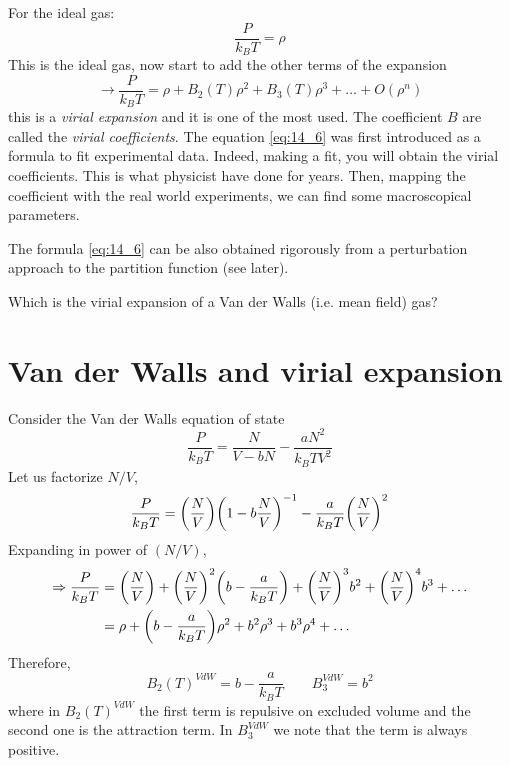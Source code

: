 \documentclass[../main/main.tex]{subfiles}
\begin{document}
For the ideal gas:
\begin{equation}
  \frac{P}{k_B T} = \rho
\end{equation}
This is the ideal gas, now start to add the other terms of the expansion
\begin{equation}
  \rightarrow \frac{P}{k_B T} = \rho + B_2 (T) \rho ^2 + B_3 (T)\rho ^3+ \dots + O(\rho ^n)
  \label{eq:14_6}
\end{equation}
this is a \emph{virial expansion} and it is one of the most used. The coefficient \( B \) are called the \emph{virial coefficients}.
The equation \eqref{eq:14_6} was first introduced as a formula to fit experimental data. Indeed, making a fit, you will obtain the virial coefficients. This is what physicist have done for years.  Then, mapping the coefficient with the real world experiments, we can find some macroscopical parameters.

The formula \eqref{eq:14_6} can be also obtained rigorously from a perturbation approach to the partition function (see later).

Which is the virial expansion of a Van der Walls (i.e. mean field) gas?

\section{Van der Walls and virial expansion}
Consider the Van der Walls equation of state
\begin{equation}
  \frac{P}{k_B T} = \frac{N}{V-bN} - \frac{a N^2}{k_B T V^2}
\end{equation}
Let us factorize \( N/V \),
\begin{equation}
  \frac{P}{k_B T} = \qty(\frac{N}{V}) \qty(1 - b \frac{N}{V})^{-1} - \frac{a}{k_B T}\qty(\frac{N}{V})^2
\end{equation}
Expanding in power of \( (N/V) \),
\begin{equation}
\begin{split}
  \Rightarrow \frac{P}{k_B T}  &= \qty(\frac{N}{V}) + \qty(\frac{N}{V})^2 \qty(b - \frac{a}{k_B T}) + \qty(\frac{N}{V})^3 b^2 + \qty(\frac{N}{V})^4 b^3 + \dots \\
  & = \rho + \qty(b - \frac{a}{k_B T})\rho ^2 + b^2 \rho ^3 + b^3 \rho ^4 + \dots
\end{split}
\end{equation}
Therefore,
\begin{equation}
  B_2 (T)^{VdW} = b - \frac{a}{k_B T} \qquad B_3^{VdW} = b^2
\end{equation}
where in \( B_2 (T)^{VdW}  \) the first term is repulsive on excluded volume and the second one is the attraction term. In \( B_3^{VdW} \) we note that the term is always positive.
\end{document}
